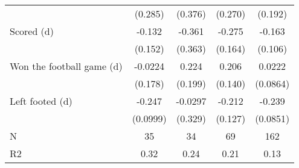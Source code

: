 {\begin{tabular}{l*{4}{c}}
                    &     (0.285)         &     (0.376)         &     (0.270)         &     (0.192)         \\
[1em]
Scored (d)          &      -0.132         &      -0.361         &      -0.275\sym{*}  &      -0.163         \\
                    &     (0.152)         &     (0.363)         &     (0.164)         &     (0.106)         \\
[1em]
Won the football game (d)&     -0.0224         &       0.224         &       0.206         &      0.0222         \\
                    &     (0.178)         &     (0.199)         &     (0.140)         &    (0.0864)         \\
[1em]
Left footed (d)     &      -0.247\sym{**} &     -0.0297         &      -0.212\sym{*}  &      -0.239\sym{***}\\
                    &    (0.0999)         &     (0.329)         &     (0.127)         &    (0.0851)         \\
\hline
N                   &          35         &          34         &          69         &         162         \\
R2                  &        0.32         &        0.24         &        0.21         &        0.13         \\
\hline\hline
\end{tabular}
}
